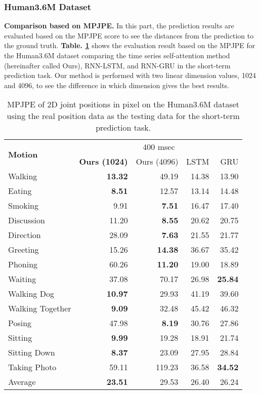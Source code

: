 \subsubsection{Human3.6M Dataset}\label{4:2Dhuman3.6}


\textbf{Comparison based on MPJPE.} In this part, the prediction results are evaluated based on the MPJPE score to see the distances from the prediction to the ground truth.
\textbf{Table. \ref{tbl:2DMPJPE_gt_short}} shows the evaluation result based on the MPJPE for the Human3.6M dataset comparing the time series self-attention method (hereinafter called Ours), RNN-LSTM, and RNN-GRU in the short-term prediction task. Our method is performed with two linear dimension values, 1024 and 4096, to see the difference in which dimension gives the best results. 

\begin{table}
    \centering
    \caption{MPJPE of 2D joint positions in pixel on the Human3.6M dataset using the real position data as the testing data for the short-term prediction task.}
    \begin{tabular}{l|rrrr}
        \toprule
        \multirow{2}{*}{\textbf{Motion}} & \multicolumn{4}{c}{400 msec} \\
            & \textbf{Ours (1024)} & Ours (4096) & LSTM & GRU  \\
        \midrule
        Walking	&	\textbf{13.32}	&	49.19	&	14.38	&	13.90\\
Eating	&	\textbf{8.51}	&	12.57	&	13.14	&	14.48	\\
Smoking	&	9.91	&	\textbf{7.51}	&	16.47	&	17.40	\\
Discussion	&	11.20	&	\textbf{8.55}	&	20.62	& 20.75 \\
Direction	&	28.09	&	\textbf{7.63}	&	21.55	& 21.77 \\
Greeting	&	15.26	&	\textbf{14.38}	&	36.67	& 35.42 \\
Phoning	&	60.26	&	\textbf{11.20}	&	19.00	&	18.89 \\
Waiting	&	37.08	&	70.17	&	26.98	&	\textbf{25.84} \\
Walking Dog	&	\textbf{10.97}	&	29.93	&	41.19	&	39.60 \\
Walking Together	&	\textbf{9.09}	&	32.48	&	45.42	&	46.32	\\
Posing	&	47.98	&	\textbf{8.19}	&	30.76	&	27.86	\\
Sitting	&	\textbf{9.99}	&	19.28	&	18.91	&	21.74	\\
Sitting Down	&	\textbf{8.37}	&	23.09	&	27.95	&	28.84 \\
Taking Photo	&	59.11	&	119.23	&	36.58	&	\textbf{34.52}	\\

        \midrule
        Average	&	\textbf{23.51} 	&	29.53	&	26.40	&	26.24	\\
        \bottomrule
    \end{tabular}
    \label{tbl:2DMPJPE_gt_short}
\end{table}

